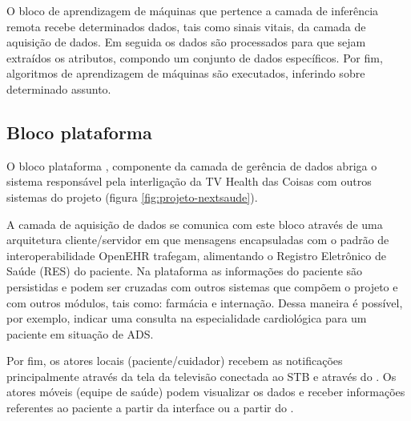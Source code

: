 O bloco de aprendizagem de máquinas que pertence a camada de inferência remota
recebe determinados dados, tais como sinais vitais, da camada de aquisição de
dados. Em seguida os dados são processados para que sejam extraídos os atributos,
compondo um conjunto de dados específicos. Por fim, algoritmos de aprendizagem
de máquinas são executados, inferindo sobre determinado assunto.

\subsection{Bloco plataforma \nextsaude}

O bloco plataforma \nextsaude[], componente da camada de gerência de dados abriga
o sistema responsável pela interligação da TV Health das Coisas com outros sistemas
do projeto \nextsaude[] (figura \ref{fig:projeto-nextsaude}).


A camada de aquisição de dados se comunica com este bloco através de uma
arquitetura cliente/servidor em que mensagens encapsuladas com o padrão
de interoperabilidade OpenEHR trafegam, alimentando o Registro Eletrônico
de Saúde (RES) do paciente. Na plataforma as informações do paciente são
persistidas e podem ser cruzadas com outros sistemas que compõem o projeto
\nextsaude[] e com outros módulos, tais como: farmácia e internação.
Dessa maneira é possível, por exemplo, indicar uma consulta na especialidade
cardiológica para um paciente em situação de ADS.



Por fim, os atores locais (paciente/cuidador) 
recebem as notificações principalmente através da tela da televisão conectada ao 
STB e através do \smartphone. Os atores móveis (equipe de saúde) podem visualizar 
os dados e receber informações referentes ao paciente a partir da interface \web[] ou 
a partir do \smartphone.





